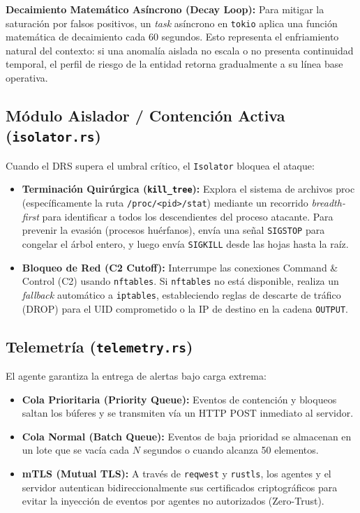\documentclass[12pt,a4paper]{article}
\begin{document}
\textbf{Decaimiento Matemático Asíncrono (Decay Loop):} Para mitigar la saturación por falsos positivos, un \textit{task} asíncrono en \texttt{tokio} aplica una función matemática de decaimiento cada 60 segundos. Esto representa el enfriamiento natural del contexto: si una anomalía aislada no escala o no presenta continuidad temporal, el perfil de riesgo de la entidad retorna gradualmente a su línea base operativa.

\subsection{Módulo Aislador / Contención Activa (\texttt{isolator.rs})}
Cuando el DRS supera el umbral crítico, el \texttt{Isolator} bloquea el ataque:
\begin{itemize}
    \item \textbf{Terminación Quirúrgica (\texttt{kill\_tree}):} Explora el sistema de archivos proc (específicamente la ruta \texttt{/proc/<pid>/stat}) mediante un recorrido \textit{breadth-first} para identificar a todos los descendientes del proceso atacante. Para prevenir la evasión (procesos huérfanos), envía una señal \texttt{SIGSTOP} para congelar el árbol entero, y luego envía \texttt{SIGKILL} desde las hojas hasta la raíz.
    \item \textbf{Bloqueo de Red (C2 Cutoff):} Interrumpe las conexiones Command \& Control (C2) usando \texttt{nftables}. Si \texttt{nftables} no está disponible, realiza un \textit{fallback} automático a \texttt{iptables}, estableciendo reglas de descarte de tráfico (DROP) para el UID comprometido o la IP de destino en la cadena \texttt{OUTPUT}.
\end{itemize}

\subsection{Telemetría (\texttt{telemetry.rs})}
El agente garantiza la entrega de alertas bajo carga extrema:
\begin{itemize}
    \item \textbf{Cola Prioritaria (Priority Queue):} Eventos de contención y bloqueos saltan los búferes y se transmiten vía un HTTP POST inmediato al servidor.
    \item \textbf{Cola Normal (Batch Queue):} Eventos de baja prioridad se almacenan en un lote que se vacía cada $N$ segundos o cuando alcanza 50 elementos.
    \item \textbf{mTLS (Mutual TLS):} A través de \texttt{reqwest} y \texttt{rustls}, los agentes y el servidor autentican bidireccionalmente sus certificados criptográficos para evitar la inyección de eventos por agentes no autorizados (Zero-Trust).
\end{itemize}
\end{document}
